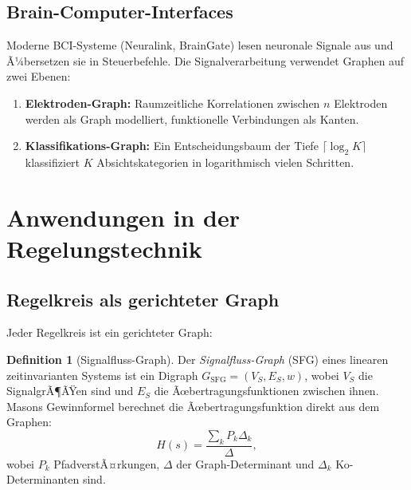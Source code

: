 ﻿\documentclass[12pt,a4paper,twoside]{article}
\theoremstyle{definition}
\newtheorem{definition}{Definition}[section]
\theoremstyle{plain}
\theoremstyle{remark}
\begin{document}
\subsection{Brain-Computer-Interfaces}

Moderne BCI-Systeme (Neuralink, BrainGate) lesen neuronale
Signale aus und Ã¼bersetzen sie in Steuerbefehle.  Die
Signalverarbeitung verwendet Graphen auf zwei Ebenen:
\begin{enumerate}
  \item \textbf{Elektroden-Graph:} Raumzeitliche Korrelationen
        zwischen $n$ Elektroden werden als Graph modelliert,
        funktionelle Verbindungen als Kanten.
  \item \textbf{Klassifikations-Graph:} Ein Entscheidungsbaum
        der Tiefe $\lceil\log_2 K\rceil$ klassifiziert $K$ Absichtskategorien
        in logarithmisch vielen Schritten.
\end{enumerate}

\section{Anwendungen in der Regelungstechnik}
\label{sec:regelung}

\subsection{Regelkreis als gerichteter Graph}

Jeder Regelkreis ist ein gerichteter Graph:

\begin{definition}[Signalfluss-Graph]
Der \emph{Signalfluss-Graph} (SFG) eines linearen
zeitinvarianten Systems ist ein Digraph $G_{\text{SFG}}=(V_S,E_S,w)$,
wobei $V_S$ die SignalgrÃ¶ÃŸen sind und $E_S$ die Ãœbertragungsfunktionen
zwischen ihnen.  Masons Gewinnformel berechnet die
Ãœbertragungsfunktion direkt aus dem Graphen:
\[
  H(s) = \frac{\sum_k P_k \Delta_k}{\Delta},
\]
wobei $P_k$ PfadverstÃ¤rkungen, $\Delta$ der Graph-Determinant
und $\Delta_k$ Ko-Determinanten sind.
\end{definition}
\end{document}
